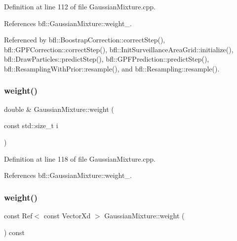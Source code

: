 Definition at line 112 of file Gaussian\+Mixture.\+cpp.



References bfl\+::\+Gaussian\+Mixture\+::weight\+\_\+.



Referenced by bfl\+::\+Boostrap\+Correction\+::correct\+Step(), bfl\+::\+G\+P\+F\+Correction\+::correct\+Step(), bfl\+::\+Init\+Surveillance\+Area\+Grid\+::initialize(), bfl\+::\+Draw\+Particles\+::predict\+Step(), bfl\+::\+G\+P\+F\+Prediction\+::predict\+Step(), bfl\+::\+Resampling\+With\+Prior\+::resample(), and bfl\+::\+Resampling\+::resample().

\mbox{\label{classbfl_1_1GaussianMixture_a44885fb208e33f37015d47f55d02ef50}} 
\subsubsection{\texorpdfstring{weight()}{weight()}\hspace{0.1cm}{\footnotesize\ttfamily [2/4]}}
{\footnotesize\ttfamily double \& Gaussian\+Mixture\+::weight (\begin{DoxyParamCaption}\item[{const std\+::size\+\_\+t}]{i }\end{DoxyParamCaption})\hspace{0.3cm}{\ttfamily [inherited]}}



Definition at line 118 of file Gaussian\+Mixture.\+cpp.



References bfl\+::\+Gaussian\+Mixture\+::weight\+\_\+.

\mbox{\label{classbfl_1_1GaussianMixture_a9ef04270bbccfe01f481665a1f390167}} 
\subsubsection{\texorpdfstring{weight()}{weight()}\hspace{0.1cm}{\footnotesize\ttfamily [3/4]}}
{\footnotesize\ttfamily const Ref$<$ const Vector\+Xd $>$ Gaussian\+Mixture\+::weight (\begin{DoxyParamCaption}{ }\end{DoxyParamCaption}) const\hspace{0.3cm}{\ttfamily [inherited]}}



